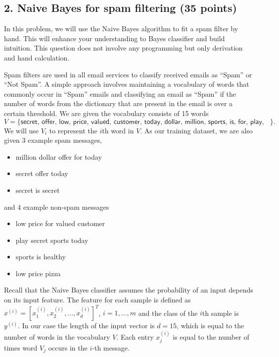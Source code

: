 \documentclass[twoside,10pt]{article}
\begin{document}
\subsection*{2. Naive Bayes for spam filtering (35 points)} 

In this problem, we will use the Naive Bayes algorithm to fit a spam filter by hand. This will enhance your understanding to Bayes classifier and build intuition. This question does not involve any programming but only derivation and hand calculation. 

Spam filters are used in all email services to classify received emails as ``Spam'' or ``Not Spam''. A simple approach involves maintaining a vocabulary of words that commonly occur in ``Spam'' emails and classifying an email as ``Spam'' if the number of words from the dictionary that are present in the email is over a certain threshold.
We are given the vocabulary consists of 15 words \[V=\{\textsf{secret, offer, low, price, valued, customer, today, dollar, million, sports, is, for, play, healthy, pizza}\}.\] We will use $V_i$ to represent the $i$th word in $V$. As our training dataset, we are also given 3 example spam messages,
\begin{itemize}
\item \textsf{million dollar offer for today}
\item \textsf{secret offer today}
\item \textsf{secret is secret}
\end{itemize}
and 4 example non-spam messages
\begin{itemize}
\item \textsf{low price for valued customer}
\item \textsf{play secret sports today}
\item \textsf{sports is healthy}
\item \textsf{low price pizza}
\end{itemize}

Recall that the Naive Bayes classifier assumes the probability of an input depends on its input feature. The feature for each sample is defined as
$x^{(i)} = [x_1^{(i)}, x_2^{(i)}, \ldots, x_d^{(i)}]^T$, $i = 1, \ldots, m$ and the class of the $i$th sample is $y^{(i)}$. In our case the length of the input vector is $d = 15$, which is equal to the number of words in the vocabulary $V$. Each entry $x_j^{(i)}$ is equal to the number of times word $V_j$ occurs in the $i$-th message. 
\end{document}
